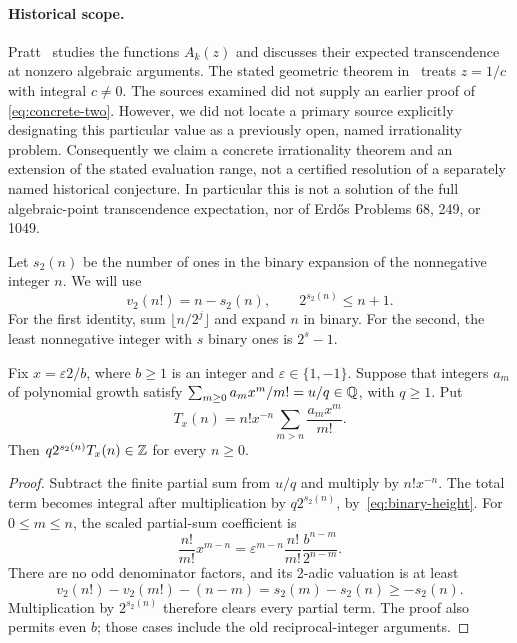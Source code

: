 \paragraph{Historical scope.}
Pratt~\cite{Pratt} studies the functions $A_k(z)$ and discusses their
expected transcendence at nonzero algebraic arguments. The stated
geometric theorem in~\cite{TGgen} treats $z=1/c$ with integral $c\ne0$.
The sources examined did not supply an earlier proof of
\eqref{eq:concrete-two}. However, we did not locate a primary source
explicitly designating this particular value as a previously open,
named irrationality problem. Consequently we claim a concrete
irrationality theorem and an extension of the stated evaluation range,
not a certified resolution of a separately named historical conjecture.
In particular this is not a solution of the full algebraic-point
transcendence expectation, nor of Erd\H{o}s Problems 68, 249, or 1049.

Let $s_2(n)$ be the number of ones in the binary expansion of the
nonnegative integer $n$. We will use
\begin{equation}\label{eq:binary-height}
 v_2(n!)=n-s_2(n),\qquad 2^{s_2(n)}\leq n+1.
\end{equation}
For the first identity, sum $\lfloor n/2^j\rfloor$ and expand $n$ in
binary. For the second, the least nonnegative integer with $s$ binary
ones is $2^s-1$.

\begin{lemma}
\label{lem:dyadic-height}
Fix $x=\varepsilon 2/b$, where $b\geq1$ is an integer and
$\varepsilon\in\{1,-1\}$. Suppose that integers $a_m$ of polynomial
growth satisfy $\sum_{m\geq0}a_mx^m/m!=u/q\in\mathbb Q$, with $q\geq1$.
Put
\[
 T_x(n)=n!x^{-n}\sum_{m>n}\frac{a_mx^m}{m!}.
\]
Then $q2^{s_2(n)}T_x(n)\in\mathbb Z$ for every $n\geq0$.
\end{lemma}
\begin{proof}
Subtract the finite partial sum from $u/q$ and multiply by
$n!x^{-n}$. The total term becomes integral after multiplication by
$q2^{s_2(n)}$, by~\eqref{eq:binary-height}. For $0\leq m\leq n$,
the scaled partial-sum coefficient is
\[
 \frac{n!}{m!}x^{m-n}
 =\varepsilon^{m-n}\frac{n!}{m!}\frac{b^{n-m}}{2^{n-m}}.
\]
There are no odd denominator factors, and its 2-adic valuation is
at least
\[
 v_2(n!)-v_2(m!)-(n-m)=s_2(m)-s_2(n)\geq-s_2(n).
\]
Multiplication by $2^{s_2(n)}$ therefore clears every partial term.
The proof also permits even $b$; those cases include the old
reciprocal-integer arguments.
\end{proof}

